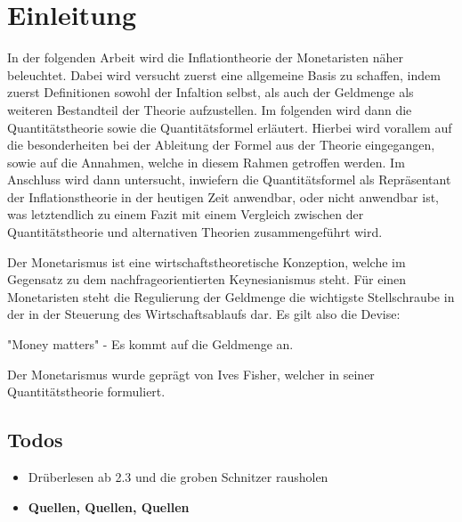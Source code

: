 \documentclass[
	12pt,
	BCOR=5mm,
	DIV=12,
	headinclude=on,
	footinclude=off,
	parskip=half,
	bibliography=totoc,
	listof=entryprefix,
	toc=listof,
	numbers=noenddot,
]{scrreprt}
\begin{document}


\tableofcontents

\listoffigures

\clearpage

\ihead{\chaptername~\thechapter}

\chapter{Einleitung}
In der folgenden Arbeit wird die Inflationtheorie der Monetaristen näher beleuchtet. Dabei wird versucht zuerst eine allgemeine Basis zu schaffen, indem zuerst Definitionen sowohl der Infaltion selbst, als auch der Geldmenge als weiteren Bestandteil der Theorie aufzustellen. Im folgenden wird dann die Quantitätstheorie sowie die Quantitätsformel erläutert. Hierbei wird vorallem auf die besonderheiten bei der Ableitung der Formel aus der Theorie eingegangen, sowie auf die Annahmen, welche in diesem Rahmen getroffen werden. Im Anschluss wird dann untersucht, inwiefern die Quantitätsformel als Repräsentant der Inflationstheorie in der heutigen Zeit anwendbar, oder nicht anwendbar ist, was letztendlich zu einem Fazit mit einem Vergleich zwischen der Quantitätstheorie und alternativen Theorien zusammengeführt wird.

Der Monetarismus ist eine wirtschaftstheoretische Konzeption, welche im Gegensatz zu dem nachfrageorientierten Keynesianismus steht. Für einen Monetaristen steht die Regulierung der Geldmenge die wichtigste Stellschraube in der in der Steuerung des Wirtschaftsablaufs dar. Es gilt also die Devise:

\begin{center}
    "Money matters" - Es kommt auf die Geldmenge an.
\end{center}

Der Monetarismus wurde geprägt von Ives Fisher, welcher in seiner Quantitätstheorie formuliert.


\section*{Todos}

\begin{itemize}
    \item Drüberlesen ab 2.3 und die groben Schnitzer rausholen
    \item \textbf{Quellen, Quellen, Quellen}
\end{itemize}
\end{document}
